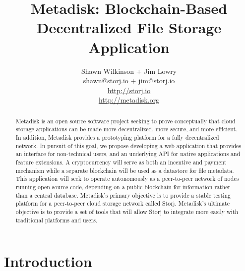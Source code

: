 \documentclass[a4paper,10pt]{article}
\begin{document}
\lstset{basicstyle=\ttfamily\footnotesize,breaklines=true}
\lstset{numbers=left, numberstyle=\tiny, stepnumber=1, numbersep=5pt}
\lstset{language=TeX}


\title{\large \bf Metadisk:  Blockchain-Based Decentralized File Storage Application}
\author{\small Shawn Wilkinson + Jim Lowry\\ \small shawn@storj.io + jim@storj.io \\  \small \url{http://storj.io} \\  \small \url{http://metadisk.org}}
\maketitle


\begin{abstract}
Metadisk is an open source software project seeking to prove conceptually that cloud storage applications can be made more decentralized, more secure, and more efficient. In addition, Metadisk provides a prototyping platform for a fully decentralized network. In pursuit of this goal, we propose developing a web application that provides an interface for non-technical users, and an underlying API for native applications and feature extensions. A cryptocurrency will serve as both an incentive and payment mechanism while a separate blockchain will be used as a datastore for file metadata. This application will seek to operate autonomously as a peer-to-peer network of nodes running open-source code, depending on a public blockchain for information rather than a central database. Metadisk’s primary objective is to provide a stable testing platform for a peer-to-peer cloud storage network called Storj. Metadisk’s ultimate objective is to provide a set of tools that will allow Storj to integrate more easily with traditional platforms and users. 
\end{abstract}
\section{Introduction}
\end{document}
